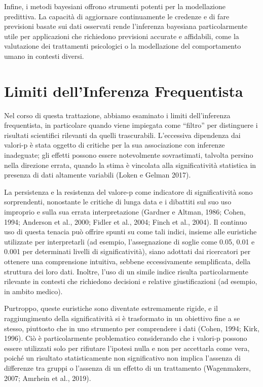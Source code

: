 \documentclass[
  letterpaper,
  krantz2]{{[}./krantz{]}}
\begin{document}
Infine, i metodi bayesiani offrono strumenti potenti per la modellazione
predittiva. La capacità di aggiornare continuamente le credenze e di
fare previsioni basate sui dati osservati rende l'inferenza bayesiana
particolarmente utile per applicazioni che richiedono previsioni
accurate e affidabili, come la valutazione dei trattamenti psicologici o
la modellazione del comportamento umano in contesti diversi.

\section*{Limiti dell'Inferenza
Frequentista}\label{limiti-dellinferenza-frequentista}


Nel corso di questa trattazione, abbiamo esaminato i limiti
dell'inferenza frequentista, in particolare quando viene impiegata come
``filtro'' per distinguere i risultati scientifici rilevanti da quelli
trascurabili. L'eccessiva dipendenza dai valori-p è stata oggetto di
critiche per la sua associazione con inferenze inadeguate; gli effetti
possono essere notevolmente sovrastimati, talvolta persino nella
direzione errata, quando la stima è vincolata alla significatività
statistica in presenza di dati altamente variabili (Loken e Gelman
2017).

La persistenza e la resistenza del valore-p come indicatore di
significatività sono sorprendenti, nonostante le critiche di lunga data
e i dibattiti sul suo uso improprio e sulla sua errata interpretazione
(Gardner e Altman, 1986; Cohen, 1994; Anderson et al., 2000; Fidler et
al., 2004; Finch et al., 2004). Il continuo uso di questa tenacia può
offrire spunti su come tali indici, insieme alle euristiche utilizzate
per interpretarli (ad esempio, l'assegnazione di soglie come 0.05, 0.01
e 0.001 per determinati livelli di significatività), siano adottati dai
ricercatori per ottenere una comprensione intuitiva, sebbene
eccessivamente semplificata, della struttura dei loro dati. Inoltre,
l'uso di un simile indice risulta particolarmente rilevante in contesti
che richiedono decisioni e relative giustificazioni (ad esempio, in
ambito medico).

Purtroppo, queste euristiche sono diventate estremamente rigide, e il
raggiungimento della significatività si è trasformato in un obiettivo
fine a se stesso, piuttosto che in uno strumento per comprendere i dati
(Cohen, 1994; Kirk, 1996). Ciò è particolarmente problematico
considerando che i valori-p possono essere utilizzati solo per rifiutare
l'ipotesi nulla e non per accettarla come vera, poiché un risultato
statisticamente non significativo non implica l'assenza di differenze
tra gruppi o l'assenza di un effetto di un trattamento (Wagenmakers,
2007; Amrhein et al., 2019).
\end{document}
